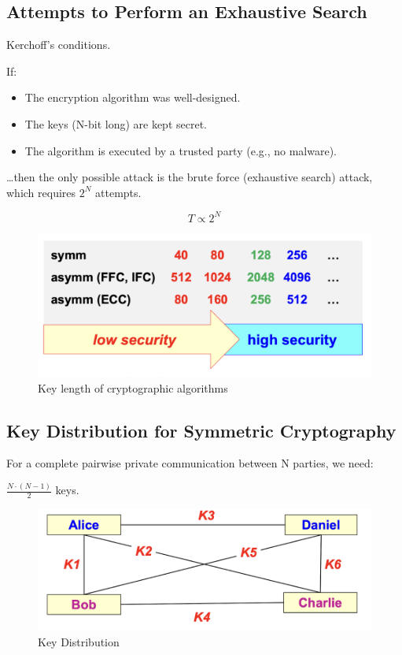 \subsection*{Attempts to Perform an Exhaustive Search}
\begin{center}
    Kerchoff's conditions.
\end{center}

If:
\begin{itemize}
    \item The encryption algorithm was well-designed.
    \item The keys (N-bit long) are kept secret.
    \item The algorithm is executed by a trusted party (e.g., no malware).
\end{itemize}
\dots then the only possible attack is the brute force (exhaustive search) attack, which requires $2^N$ attempts.

\[
    \boxed{T \propto 2^N}
\]

\begin{figure}[H]
    \centering
    \includegraphics[width=0.8\linewidth]{Images/Cryptography/crypto_key_lens.png}
    \caption{Key length of cryptographic algorithms}
\end{figure}

\subsection{Key Distribution for Symmetric Cryptography}
\raggedcolumns
\begin{multicols}{2}

\noindent For a complete pairwise private communication between N parties, we need:
\begin{center}
    $\displaystyle\frac{N \cdot (N-1)}{2}$ keys.
\end{center}

\columnbreak

    \begin{figure}[H]
        \centering
        \includegraphics[width=\linewidth]{Images/Cryptography/key_dist_symm.png}
        \caption{Key Distribution}
    \end{figure}
\end{multicols}


